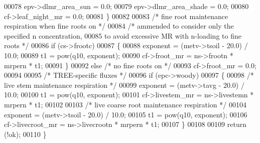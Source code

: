 \begin{DoxyCode}
00078         epv->dlmr\_area\_sun = 0.0;
00079         epv->dlmr\_area\_shade = 0.0;
00080         cf->leaf\_night\_mr = 0.0;
00081     \}
00082 
00083     \textcolor{comment}{/* fine root maintenance respiration when fine roots on */}
00084     \textcolor{comment}{/* ammended to consider only the specified n concentration,}
00085 \textcolor{comment}{    to avoid excessive MR with n-loading to fine roots */}
00086     \textcolor{keywordflow}{if} (cs->frootc)
00087     \{
00088         exponent = (metv->tsoil - 20.0) / 10.0;
00089         t1 = pow(q10, exponent);
00090         cf->froot\_mr = ns->frootn * mrpern * t1;
00091     \}
00092     \textcolor{keywordflow}{else} \textcolor{comment}{/* no fine roots on */}
00093         cf->froot\_mr = 0.0;
00094 
00095     \textcolor{comment}{/* TREE-specific fluxes */}
00096     \textcolor{keywordflow}{if} (epc->woody)
00097     \{
00098         \textcolor{comment}{/* live stem maintenance respiration */}
00099         exponent = (metv->tavg - 20.0) / 10.0;
00100         t1 = pow(q10, exponent);
00101         cf->livestem\_mr = ns->livestemn * mrpern * t1;
00102 
00103         \textcolor{comment}{/* live coarse root maintenance respiration */}
00104         exponent = (metv->tsoil - 20.0) / 10.0;
00105         t1 = pow(q10, exponent);
00106         cf->livecroot\_mr = ns->livecrootn * mrpern * t1;
00107     \}
00108     
00109     \textcolor{keywordflow}{return} (!ok);
00110 \}
\end{DoxyCode}
